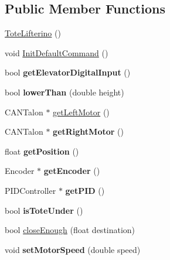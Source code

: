 \subsection*{Public Member Functions}
\begin{DoxyCompactItemize}
\item 
\hyperlink{class_tote_lifterino_a6e94e09ac4fdc3b56101cccfe63385d5}{Tote\+Lifterino} ()
\item 
void \hyperlink{class_tote_lifterino_a972bde0b7cb90474cf63fadad3a9297c}{Init\+Default\+Command} ()
\item 
\hypertarget{class_tote_lifterino_a203f5417db4d710fbf5ddba98d75e0b2}{}bool {\bfseries get\+Elevator\+Digital\+Input} ()\label{class_tote_lifterino_a203f5417db4d710fbf5ddba98d75e0b2}

\item 
\hypertarget{class_tote_lifterino_a3a5cbfd809e851a8cbd5202ea0565626}{}bool {\bfseries lower\+Than} (double height)\label{class_tote_lifterino_a3a5cbfd809e851a8cbd5202ea0565626}

\item 
C\+A\+N\+Talon $\ast$ \hyperlink{class_tote_lifterino_a853d0d90d50406b572d1518719e4f866}{get\+Left\+Motor} ()
\item 
\hypertarget{class_tote_lifterino_abda31d2e071bd526afd95a35d7dc0f14}{}C\+A\+N\+Talon $\ast$ {\bfseries get\+Right\+Motor} ()\label{class_tote_lifterino_abda31d2e071bd526afd95a35d7dc0f14}

\item 
\hypertarget{class_tote_lifterino_a843259169828493c1a347af0906cf1d5}{}float {\bfseries get\+Position} ()\label{class_tote_lifterino_a843259169828493c1a347af0906cf1d5}

\item 
\hypertarget{class_tote_lifterino_a2e7f3a02eebaddca1805c282715a6659}{}Encoder $\ast$ {\bfseries get\+Encoder} ()\label{class_tote_lifterino_a2e7f3a02eebaddca1805c282715a6659}

\item 
\hypertarget{class_tote_lifterino_af6781e4b7e6a9a5e1f7f8e68ff84500c}{}P\+I\+D\+Controller $\ast$ {\bfseries get\+P\+I\+D} ()\label{class_tote_lifterino_af6781e4b7e6a9a5e1f7f8e68ff84500c}

\item 
\hypertarget{class_tote_lifterino_adec58eb5c2193a45a53f8f9f4812875a}{}bool {\bfseries is\+Tote\+Under} ()\label{class_tote_lifterino_adec58eb5c2193a45a53f8f9f4812875a}

\item 
bool \hyperlink{class_tote_lifterino_a6d449a8d4da13035d3f8e0088800f17e}{close\+Enough} (float destination)
\item 
\hypertarget{class_tote_lifterino_a116242e1863680c49bc06d4b1156fa3a}{}void {\bfseries set\+Motor\+Speed} (double speed)\label{class_tote_lifterino_a116242e1863680c49bc06d4b1156fa3a}


\end{DoxyCompactItemize}
